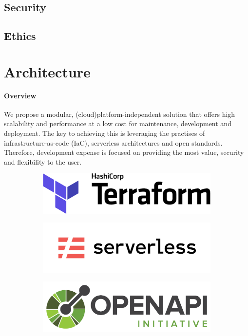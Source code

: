 \documentclass[10pt]{article}
\begin{document}
\subsection{Security}
\subsection{Ethics}

\newpage
\section{Architecture}
\paragraph{Overview}
We propose a modular, (cloud)platform-independent solution that offers high scalability and performance at a low cost for maintenance, development and deployment. The key to achieving this is leveraging the practises of infrastructure-as-code (IaC), serverless architectures and open standards. Therefore, development expense is focused on providing the most value, security and flexibility to the user.\\

\begin{figure}[h!]
	\centering
	\begin{subfigure}{0.25\linewidth}
		\includegraphics[width=\linewidth]{images/Terraform.png}
	\end{subfigure}
	\begin{subfigure}{0.25\linewidth}
		\includegraphics[width=\linewidth]{images/Serverless.png}
	\end{subfigure}
	\begin{subfigure}{0.25\linewidth}
		\includegraphics[width=\linewidth]{images/OpenAPI.png}
	\end{subfigure}
\end{figure}
\end{document}
